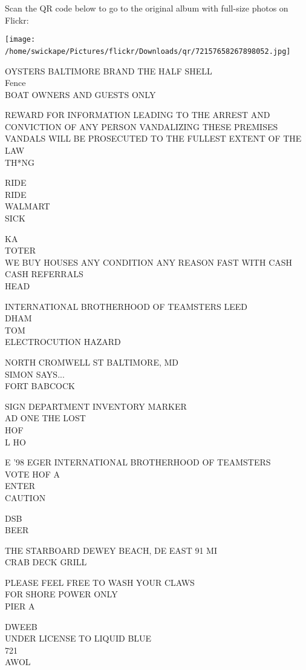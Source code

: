 \documentclass[10pt,letterpaper]{article}
\begin{document}
Scan the QR code below to go to the original album with full-size photos on Flickr:

\texttt{[image: /home/swickape/Pictures/flickr/Downloads/qr/72157658267898052.jpg]}
\

OYSTERS BALTIMORE BRAND THE HALF SHELL\\
Fence\\
BOAT OWNERS AND GUESTS ONLY

REWARD FOR INFORMATION LEADING TO THE ARREST AND CONVICTION OF ANY PERSON VANDALIZING THESE PREMISES VANDALS WILL BE PROSECUTED TO THE FULLEST EXTENT OF THE LAW\\
TH*NG

RIDE\\
RIDE\\
WALMART\\
SICK

KA\\
TOTER\\
WE BUY HOUSES ANY CONDITION ANY REASON FAST WITH CASH CASH REFERRALS\\
HEAD

INTERNATIONAL BROTHERHOOD OF TEAMSTERS LEED\\
DHAM\\
TOM\\
ELECTROCUTION HAZARD

NORTH CROMWELL ST BALTIMORE, MD\\
SIMON SAYS...\\
FORT BABCOCK

SIGN DEPARTMENT INVENTORY MARKER\\
AD ONE THE LOST\\
HOF\\
L HO

E '98 EGER INTERNATIONAL BROTHERHOOD OF TEAMSTERS\\
VOTE HOF A\\
ENTER\\
CAUTION

DSB\\
BEER

THE STARBOARD DEWEY BEACH, DE EAST 91 MI\\
CRAB DECK GRILL

PLEASE FEEL FREE TO WASH YOUR CLAWS\\
FOR SHORE POWER ONLY\\
PIER A

DWEEB\\
UNDER LICENSE TO LIQUID BLUE\\
721\\
AWOL
\end{document}

